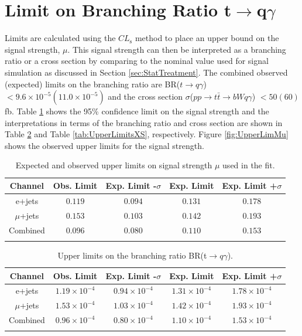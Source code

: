 \section{Limit on Branching Ratio t$\rightarrow$q$\gamma$}
\label{sec:Limits}
Limits are calculated using the $CL_\text{s}$ method to place an upper bound on the signal strength, $\mu$.  This signal strength can then be interpreted as a branching ratio or a cross section by comparing to the nominal value used for signal simulation as discussed in Section \ref{sec:StatTreatment}.  The combined observed (expected) limits on the branching ratio are  BR($t\rightarrow q \gamma$)$< 9.6\times10^{-5} (11.0\times10^{-5})$ and the cross section $\sigma$($pp\rightarrow t\bar{t} \rightarrow bWq\gamma$) $< 50 (60)$fb.  Table \ref{tab:UpperLimitsMu} shows the 95\% confidence limit on the signal strength and the interpretations in terms of the branching ratio and cross section are shown in Table \ref{tab:UpperLimitsBR} and Table \ref{tab:UpperLimitsXS}, respectively. Figure \ref{fig:UpperLimMu} shows the observed upper limits for the signal strength.
\begin{table}[h!]
\begin{center}
{\renewcommand{\arraystretch}{1.2}
\begin{tabular}{ccccc}
\hhline{=====}
Channel  	&  Obs. Limit			&	Exp. Limit -$\sigma$	& Exp. Limit	& Exp. Limit +$\sigma$  \\  \hline 
e+jets	& $0.119$ 	& $0.094$	& $0.131$ & $0.178$	\\ 
$\mu$+jets	& $0.153$ 	& $0.103$	& $0.142$ & $0.193$	\\ 
Combined	& $0.096$ 	& $0.080$	& $0.110$ & $0.153$	\\
\hhline{=====}
\end{tabular}
\caption{Expected and observed upper limits on signal strength $\mu$ used in the fit.}
\label{tab:UpperLimitsMu}
}
\end{center}
\end{table}


\begin{table}[h!]
\begin{center}
{\renewcommand{\arraystretch}{1.2}
\begin{tabular}{ccccc}
\hhline{=====}
Channel  	&  Obs. Limit			&	Exp. Limit -$\sigma$	& Exp. Limit	& Exp. Limit +$\sigma$  \\  \hline 
e+jets	& $1.19\times10^{-4}$ 	& $0.94\times10^{-4}$	& $1.31\times10^{-4}$ & $1.78\times10^{-4}$	\\ 
$\mu$+jets	& $1.53\times10^{-4}$ 	& $1.03\times10^{-4}$	& $1.42\times10^{-4}$ & $1.93\times10^{-4}$	\\ 
Combined	& $0.96\times10^{-4}$ 	& $0.80\times10^{-4}$	& $1.10\times10^{-4}$ & $1.53\times10^{-4}$	\\
\hhline{=====}
\end{tabular}
\caption{Upper limits on the branching ratio BR(t$\rightarrow q \gamma$).}
\label{tab:UpperLimitsBR}
}
\end{center}
\end{table}

